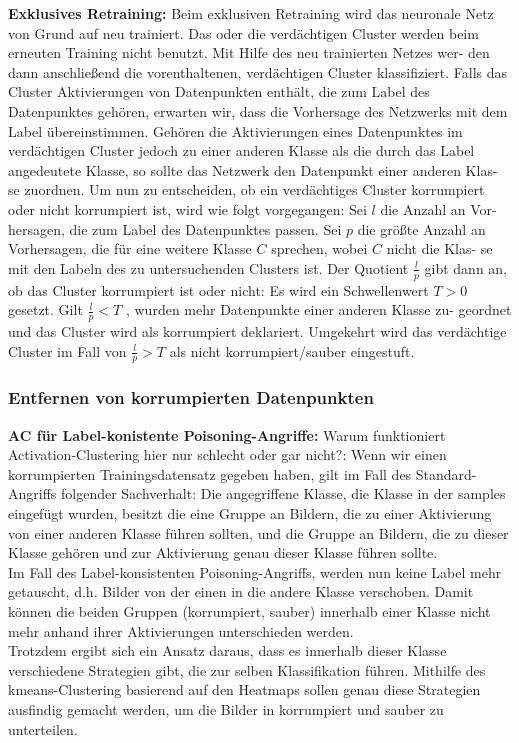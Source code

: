 \documentclass[11pt,a4paper]{article}
\numberwithin{equation}{section}
\begin{document}
	\noindent \textbf{Exklusives Retraining:} Beim exklusiven Retraining wird das neuronale Netz
	von Grund auf neu trainiert. Das oder die verdächtigen Cluster werden beim
	erneuten Training nicht benutzt. Mit Hilfe des neu trainierten Netzes wer-
	den dann anschließend die vorenthaltenen, verdächtigen Cluster klassifiziert.
	Falls das Cluster Aktivierungen von Datenpunkten enthält, die zum Label des
	Datenpunktes gehören, erwarten wir, dass die Vorhersage des Netzwerks mit
	dem Label übereinstimmen. Gehören die Aktivierungen eines Datenpunktes im
	verdächtigen Cluster jedoch zu einer anderen Klasse als die durch das Label
	angedeutete Klasse, so sollte das Netzwerk den Datenpunkt einer anderen Klas-
	se zuordnen. Um nun zu entscheiden, ob ein verdächtiges Cluster korrumpiert
	oder nicht korrumpiert ist, wird wie folgt vorgegangen: Sei $l$ die Anzahl an Vor-
	hersagen, die zum Label des Datenpunktes passen. Sei $p$ die größte Anzahl an
	Vorhersagen, die für eine weitere Klasse $C$ sprechen, wobei $C$ nicht die Klas-
	se mit den Labeln des zu untersuchenden Clusters ist. Der Quotient $\frac{l}{p}$ gibt
	dann an, ob das Cluster korrumpiert ist oder nicht: Es wird ein Schwellenwert
	$T > 0$ gesetzt. Gilt $\frac{l}{p} < T$ , wurden mehr Datenpunkte einer anderen Klasse zu-
	geordnet und das Cluster wird als korrumpiert deklariert. Umgekehrt wird das
	verdächtige Cluster im Fall von $\frac{l}{p} > T$ als nicht korrumpiert/sauber eingestuft.
	
	
	\subsubsection{Entfernen von korrumpierten Datenpunkten}
	
	\noindent \textbf{AC für Label-konistente Poisoning-Angriffe:} Warum funktioniert Activation-Clustering hier nur schlecht oder gar nicht?: Wenn wir einen korrumpierten Trainingsdatensatz gegeben haben, gilt im Fall des Standard-Angriffs folgender Sachverhalt: Die angegriffene Klasse, die Klasse in der samples eingefügt wurden, besitzt die eine Gruppe an Bildern, die zu einer Aktivierung von einer anderen Klasse führen sollten, und die Gruppe an Bildern, die zu dieser Klasse gehören und zur Aktivierung genau dieser Klasse führen sollte.\\
	Im Fall des Label-konsistenten Poisoning-Angriffs, werden nun keine Label mehr getauscht, d.h. Bilder von der einen in die andere Klasse verschoben. Damit können die beiden Gruppen (korrumpiert, sauber) innerhalb einer Klasse nicht mehr anhand ihrer Aktivierungen unterschieden werden.\\
	Trotzdem ergibt sich ein Ansatz daraus, dass es innerhalb dieser Klasse verschiedene \glqq Strategien\grqq{}  gibt, die zur selben Klassifikation führen. Mithilfe des kmeans-Clustering basierend auf den Heatmaps sollen genau diese Strategien ausfindig gemacht werden, um die Bilder in korrumpiert und sauber zu unterteilen.
	
\end{document}

